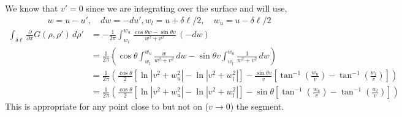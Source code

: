 \documentclass{article}
\newcommand{\0}{\varnothing}
\begin{document}
\noindent We know that $v'=0$ since we are integrating over the surface and will use, 
\begin{align*}
    w = u - u', \quad dw = - du', w_l = u + \delta \ell/2, \quad  w_u = u - \delta \ell/2
\end{align*}
\begin{align*}
    \int_{\delta\ell}\frac{\partial}{\partial x}G(\rho,\rho')\, d\rho' 
    &= -\frac{1}{2\pi}\int_{w_l}^{w_u}\frac{\cos{\theta}w - \sin{\theta} v}{w^2 + v^2}\,(-dw)\\
    &= \frac{1}{2\pi}\left( \cos{\theta} \int_{w_l}^{w_u}\frac{w}{w^2 + v^2}\,dw - \sin{\theta} v\int_{w_l}^{w_u}\frac{1}{w^2 + v^2}\,dw \right)\\
    &= \frac{1}{2\pi}\left( \frac{\cos{\theta}}{2} \left[ \ln |v^2 + w_u^2| - \ln |v^2 + w_l^2|\right] - \frac{\sin{\theta} v}{v} \left[ \tan^{-1} \left( \frac{w_u}{v} \right) -  \tan^{-1} \left( \frac{w_l}{v} \right)\right] \right)\\\textbf{}
    &= \frac{1}{2\pi}\left( \frac{\cos{\theta}}{2} \left[ \ln |v^2 + w_u^2| - \ln |v^2 + w_l^2|\right] - \sin{\theta} \left[ \tan^{-1} \left( \frac{w_u}{v} \right) -  \tan^{-1} \left( \frac{w_l}{v} \right)\right] \right)
\end{align*}
This is appropriate for any point close to but not on ($v \to 0$) the segment.
\end{document}
